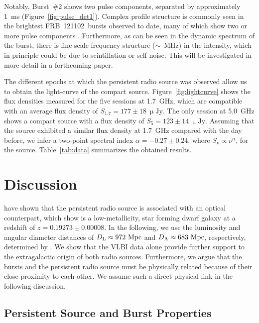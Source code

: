\documentclass[twocolumn]{aastex61}
\newcommand{\frb}{FRB~121102\xspace}
\begin{document}
Notably, Burst~\#2 shows two pulse components, separated by approximately 1~ms (Figure~\ref{fig:pulse_det1}).  Complex profile structure is commonly seen in the brightest \frb\ bursts observed to date, many of which show two or more pulse components \citep[][Hessels et al., in prep.]{ssh+16a}.  Furthermore, as can be seen in the dynamic spectrum of the burst, there is fine-scale frequency structure ($\sim$~MHz) in the intensity, which in principle could be due to scintillation or self noise.  This will be investigated in more detail in a forthcoming paper.

The different epochs at which the persistent radio source was observed allow us to obtain the light-curve of the compact source. Figure~\ref{fig:lightcurve} shows the flux densities measured for the five sessions at 1.7~GHz, which are compatible with an average flux density of $S_{1.7} = 177 \pm 18\ \mathrm{\upmu Jy}$. The only session at 5.0~GHz shows a compact source with a flux density of $S_{5} = 123 \pm 14\ \mathrm{\upmu Jy}$. Assuming that the source exhibited a similar flux density at 1.7~GHz compared with the day before, we infer a two-point spectral index $\alpha = -0.27 \pm 0.24$, where $S_{\nu} \propto \nu^{\alpha}$, for the source. Table~\ref{tab:data} summarizes the obtained results.

\section{Discussion} \label{sec:discussion}

\citet{chatterjee2017} have shown that the persistent radio source is associated with an optical counterpart, which \citet{tendulkar2017} show is a low-metallicity, star forming dwarf galaxy at a redshift of $z = 0.19273 \pm 0.00008$.
In the following, we use the luminosity and angular diameter distances of $D_{\rm L} \approx 972\ \mathrm{Mpc}$ and $D_{\rm A} \approx 683\ \mathrm{Mpc}$, respectively, determined by \citet{tendulkar2017}. We show that the VLBI data alone provide further support to the extragalactic origin of both radio sources. Furthermore, we argue that the bursts and the persistent radio source must be physically related because of their close proximity to each other.  We assume such a direct physical link in the following discussion.

\subsection{Persistent Source and Burst Properties} \label{subsec:persistent}
\end{document}
